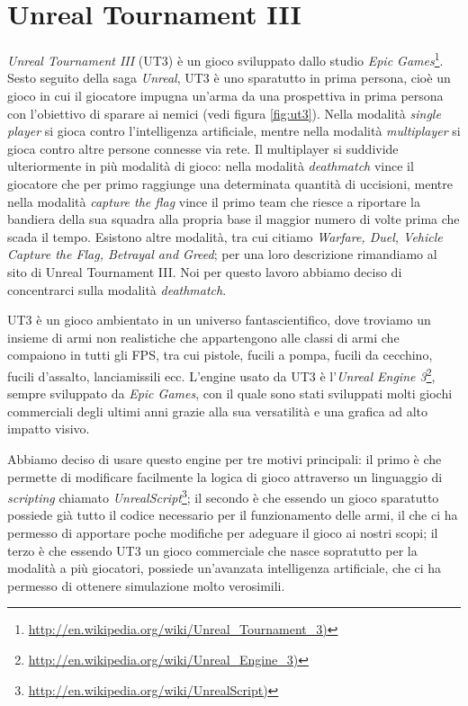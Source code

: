 \documentclass[12pt, italian]{toptesi}
\begin{document}
\section{Unreal Tournament III}
\emph{Unreal Tournament III} (UT3) è un gioco sviluppato dallo studio \emph{Epic Games}\footnote{\url{http://en.wikipedia.org/wiki/Unreal_Tournament_3)}}.
Sesto seguito della saga \emph{Unreal}, UT3 è uno sparatutto in prima persona, cioè un gioco in cui il giocatore impugna un'arma da una prospettiva in prima persona con l'obiettivo di sparare ai nemici (vedi figura \ref{fig:ut3}).
Nella modalità \emph{single player} si gioca contro l'intelligenza artificiale, mentre nella modalità \emph{multiplayer} si gioca contro altre persone connesse via rete.
Il multiplayer si suddivide ulteriormente in più modalità di gioco: nella modalità \emph{deathmatch} vince il giocatore che per primo raggiunge una determinata quantità di uccisioni, mentre nella modalità \emph{capture the flag} vince il primo team che riesce a riportare la bandiera della sua squadra alla propria base il maggior numero di volte prima che scada il tempo.
Esistono altre modalità, tra cui citiamo \emph{Warfare, Duel, Vehicle Capture the Flag, Betrayal and Greed}; per una loro descrizione rimandiamo al sito di Unreal Tournament III. 
Noi per questo lavoro abbiamo deciso di concentrarci sulla modalità \emph{deathmatch}.

UT3 è un gioco ambientato in un universo fantascientifico, dove troviamo un insieme di armi non realistiche che appartengono alle classi di armi che compaiono in tutti gli FPS, tra cui pistole, fucili a pompa, fucili da cecchino, fucili d'assalto, lanciamissili ecc.
L'engine usato da UT3 è l'\emph{Unreal Engine 3}\footnote{\url{http://en.wikipedia.org/wiki/Unreal_Engine_3)}}, sempre sviluppato da \emph{Epic Games}, con il quale sono stati sviluppati molti giochi commerciali degli ultimi anni grazie alla sua versatilità e una grafica ad alto impatto visivo.

Abbiamo deciso di usare questo engine per tre motivi principali: il primo è che permette di modificare facilmente la logica di gioco attraverso un linguaggio di \emph{scripting} chiamato \emph{UnrealScript}\footnote{\url{http://en.wikipedia.org/wiki/UnrealScript)}}; il secondo è che essendo un gioco sparatutto possiede già tutto il codice necessario per il funzionamento delle armi, il che ci ha permesso di apportare poche modifiche per adeguare il gioco ai nostri scopi; il terzo è che essendo UT3 un gioco commerciale che nasce sopratutto per la modalità a più giocatori, possiede un'avanzata intelligenza artificiale, che ci ha permesso di ottenere simulazione molto verosimili.
\end{document}
